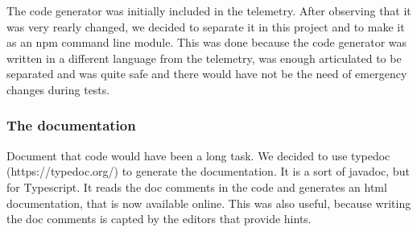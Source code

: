 The code generator was initially included in the telemetry. After observing that it was very rearly changed, we decided to separate it in this 
project and to make it as an npm command line module. This was done because the code generator was written in a different language from the 
telemetry, was enough articulated to be separated and was quite safe and there would have not be the need of emergency changes during tests.

\subsubsection{The documentation}

Document that code would have been a long task. We decided to use typedoc (https://typedoc.org/) to generate the documentation. It is a sort of
javadoc, but for Typescript. It reads the doc comments in the code and generates an html documentation, that is now available online. This was
also useful, because writing the doc comments is capted by the editors that provide hints.